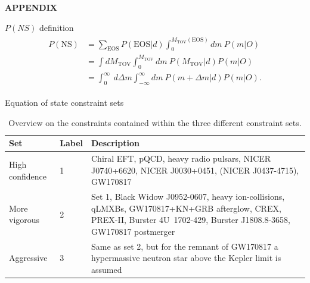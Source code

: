 \documentclass[usenames,dvipsnames,t]{beamer}
\newcommand{\mtov}{M_{\text{TOV}}}
\begin{document}

    


\appendix

\begin{frame}
\vfill
\centering
\textbf{APPENDIX}
\vfill
\end{frame}

\begin{frame}{$P(NS)$ definition}
  \begin{align*}\label{eq: probability of NS}
    \begin{split}
        P(\text{NS}) &= \sum_{\text{EOS}} P(\text{EOS}|d) \int_{0}^{\mtov(\text{EOS})} dm\ P(m|O) \\
                     &= \int d\mtov \int_{0}^{\mtov} dm\ P(\mtov|d) P(m|O)\\
                     &= \int_0^{\infty}\ d\Delta m \int_{-\infty}^{\infty} dm\ P(m+\Delta m|d) P(m|O).
    \end{split}
    \end{align*}
\end{frame}

\begin{frame}{Equation of state constraint sets}

  \small
\begin{table}[t]
  \renewcommand{\arraystretch}{1.1}
  \caption{Overview on the constraints contained within the three different constraint sets.}
  \label{tab:sets}
  \begin{tabular}{ l l p{7cm}}
  \toprule
  \toprule
  Set & Label & Description \\
  \midrule
  High confidence & 1 & Chiral EFT, pQCD, heavy radio pulsars, NICER \mbox{J0740+6620}, NICER \mbox{J0030+0451}, (NICER \mbox{J0437-4715}), GW170817\\
  \midrule
  More vigorous & 2 & Set 1, Black Widow \mbox{J0952-0607}, heavy ion-collisions, qLMXBs, GW170817+KN+GRB afterglow, CREX, PREX-II, Burster \mbox{4U 1702-429}, Burster \mbox{J1808.8-3658}, GW170817 postmerger\\
  \midrule
  Aggressive & 3 & Same as set 2, but for the remnant of GW170817 a hypermassive neutron star above the Kepler limit is assumed \\
  \bottomrule
  \end{tabular}
\end{table} 
\normalsize

\end{frame}
\end{document}
